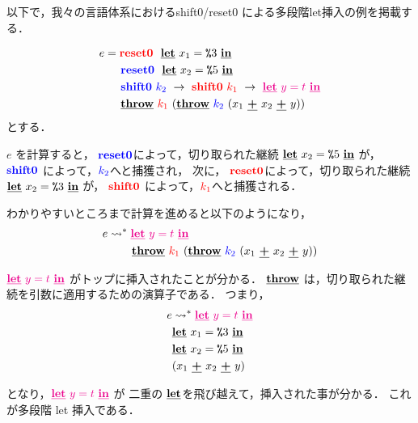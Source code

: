 以下で，我々の言語体系におけるshift0/reset0 による多段階let挿入の例を掲載する．

\begin{align*}
    e &= \red{\Resetz} ~~\cLet~x_1=\csp{3}~\cIn \\
      &\phantom{=}~~ \blue{\Resetz} ~~\cLet~x_2=\csp{5}~\cIn \\
      &\phantom{=}~~ \blue{\Shiftz}~\blue{k_2}~\to~ \red{\Shiftz}~\red{k_1}~\to~ \magenta{\cLet~y=t~\cIn} \\
      &\phantom{=}~~ \cThrow~\red{k_1}~(\cThrow~\blue{k_2}~(x_1~\cPlus~x_2~\cPlus~y))
\end{align*}
とする．

$e$ を計算すると，
$\blue{\Resetz}$によって，切り取られた継続 $\cLet~x_2=\csp{5}~\cIn$ が，
$\blue{\Shiftz}$ によって，$\blue{k_2}$へと捕獲され，
次に，
$\red{\Resetz}$によって，切り取られた継続 $\cLet~x_2=\csp{3}~\cIn$ が，
$\red{\Shiftz}$ によって，$\red{k_1}$へと捕獲される．

わかりやすいところまで計算を進めると以下のようになり，
\begin{align*}
  e & \too \magenta{\cLet~y=t~\cIn} \\
    & \phantom{\too}~~ \cThrow~\red{k_1}~(\cThrow~\blue{k_2}~(x_1~\cPlus~x_2~\cPlus~y))
\end{align*}

$\magenta{\cLet~y=t~\cIn}$ がトップに挿入されたことが分かる．
$\cThrow$ は，切り取られた継続を引数に適用するための演算子である．
つまり，
\begin{align*}
  e & \too \magenta{\cLet~y=t~\cIn} \\
    & \cLet~x_1=\csp{3}~\cIn \\
    & \cLet~x_2=\csp{5}~\cIn \\
    & (x_1~\cPlus~x_2~\cPlus~y)
\end{align*}

となり，$\magenta{\cLet~y=t~\cIn}$ が 二重の $\cLet$を飛び越えて，挿入された事が分かる．
これが多段階 let 挿入である．


